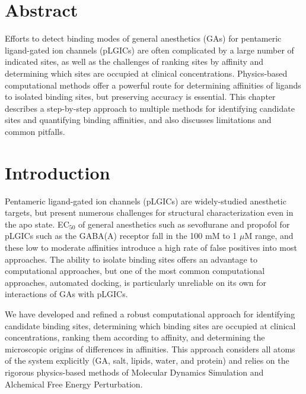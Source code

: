 \documentclass[12pt]{article}
\author{A Author}
\begin{document}

\section*{Abstract}
Efforts to detect binding modes of general anesthetics (GAs) for pentameric ligand-gated ion channels (pLGICs) are often complicated by a large number of indicated sites, as well as the challenges of ranking sites by affinity and determining which sites are occupied at clinical concentrations.  Physics-based computational methods offer a powerful route for determining affinities of ligands to isolated binding sites, but preserving accuracy is essential.  This chapter describes a step-by-step approach to multiple methods for identifying candidate sites and quantifying binding affinities, and also discusses limitations and common pitfalls.



\section{Introduction}

Pentameric ligand-gated ion channels (pLGICs) are widely-studied anesthetic targets, but present numerous challenges for structural characterization even in the apo state.  EC$_{50}$ of general anesthetics such as sevoflurane and propofol for pLGICs such as the GABA(A) receptor fall in the 100 mM to 1 $\mu$M range, and these low to moderate affinities introduce a high rate of false positives into most approaches.  The ability to isolate binding sites offers an advantage to computational approaches, but one of the most common computational approaches, automated docking, is particularly unreliable on its own for interactions of GAs with pLGICs.  

We have developed and refined a robust computational approach for identifying candidate binding sites, determining which binding sites are occupied at clinical concentrations, ranking them according to affinity, and determining the microscopic origins of differences in affinities. This approach considers all atoms of the system explicitly (GA, salt, lipids, water, and protein) and relies on the rigorous physics-based methods of Molecular Dynamics Simulation and Alchemical Free Energy Perturbation. 
\end{document}
